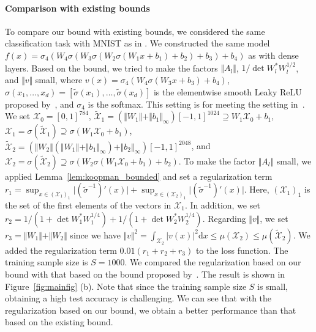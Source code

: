 \documentclass[twoside]{article}
\def\mcl#1{\mathcal{#1}}
\def\mr{\mathrm}
\begin{document}
\paragraph{Comparison with existing bounds}%
To compare our bound with existing bounds, we considered the same classification task with MNIST as in \citet{hashimoto2024koopmanbased}.
We constructed the same model $f(x)=\sigma_4(W_4\sigma(W_3\sigma(W_2\sigma(W_1x+b_1)+b_2)+b_3)+b_4)$ as \citet{hashimoto2024koopmanbased} with dense layers.
Based on the bound, we tried to make the factors $\Vert A_l\Vert$, $1/\det W_l^*W_l^{1/2}$, and $\Vert v\Vert$ small, where $v(x)=\sigma_4(W_4\sigma(W_3x+b_3)+b_4)$, $\sigma(x_1,\ldots,x_d)=[\tilde{\sigma}(x_1),\ldots,\tilde{\sigma}(x_d)]$ is the elementwise smooth Leaky ReLU proposed by~\citet{biswas22}, and $\sigma_4$ is the softmax.
This setting is for meeting the setting in~\citep{hashimoto2024koopmanbased}.
We set $\mcl{X}_0=[0,1]^{784}$, $\tilde{\mcl{X}}_1=(\Vert W_1\Vert +\Vert b_1\Vert_{\infty})[-1,1]^{1024}\supseteq W_1\mcl{X}_0+b_1$, $\mcl{X}_1=\sigma(\tilde{\mcl{X}}_1)\supseteq \sigma(W_1\mcl{X}_0+b_1)$,
$\tilde{\mcl{X}}_2=(\Vert W_2\Vert(\Vert W_1\Vert +\Vert b_1\Vert_{\infty})+\Vert b_2\Vert_{\infty})[-1,1]^{2048}$, and $\mcl{X}_2=\sigma(\tilde{\mcl{X}}_2)\supseteq \sigma(W_2\sigma(W_1\mcl{X}_0+b_1)+b_2)$.
To make the factor $\Vert A_l\Vert$ small, we applied Lemma~\ref{lem:koopman_bounded} and set a regularization term $r_1=\sup_{x\in (\mcl{X}_1)_1}\vert (\tilde{\sigma}^{-1})'(x)\vert+\sup_{x\in (\mcl{X}_2)_1}\vert (\tilde{\sigma}^{-1})'(x)\vert$.
Here, $(\mcl{X}_1)_1$ is the set of the first elements of the vectors in $\mcl{X}_1$.
In addition, we set $r_2=1/(1+\det W_1^*W_1^{1/4})+1/(1+\det W_2^*W_2^{1/4})$.
Regarding $\Vert v\Vert$, we set $r_3=\Vert W_1\Vert+\Vert W_2\Vert$ since we have
$\Vert v\Vert^2=\int_{\mcl{X}_2}\vert v(x)\vert^2 \mr{d}x
\le \mu(\mcl{X}_2)\le \mu(\tilde{\mcl{X}}_2)$.
We added the regularization term $0.01(r_1+r_2+r_3)$ to the loss function.
The training sample size is $S=1000$.
We compared the regularization based on our bound with that based on the bound proposed by~\citet{hashimoto2024koopmanbased}.
The result is shown in Figure~\ref{fig:mainfig} (b).
Note that since the training sample size $S$ is small, obtaining a high test accuracy is challenging.
We can see that with the regularization based on our bound, we obtain a better performance than that based on the existing bound.
\end{document}
